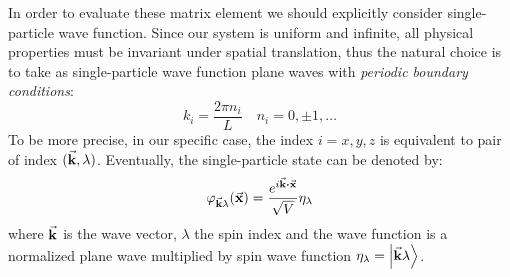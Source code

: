 \documentclass[../main/main.tex]{subfiles}
\begin{document}
In order to evaluate these matrix element we should explicitly consider single-particle wave function.
Since our system is uniform and infinite, all physical properties must be invariant under spatial translation, thus the natural choice is to take as single-particle wave function plane waves with \emph{periodic boundary conditions}:
\begin{equation*}
  k_i = \frac{2 \pi n_i}{L} \quad n_i=0,\pm1,\dots
\end{equation*}
To be more precise, in our specific case, the index \( i=x,y,z \) is equivalent  to pair of index \( (\va{k},\lambda ) \).
Eventually, the single-particle state can be denoted by:
\begin{equation*}
  \varphi_{\va{k} \lambda } (\va{x}) = \frac{e^{i \va{k}\vdot \va{x}} }{\sqrt{V} } \eta _ \lambda
\end{equation*}
 where \( \va{k} \) is the wave vector, \( \lambda  \) the spin index and the wave function is a normalized plane wave multiplied by spin wave function \( \eta _ \lambda = \ket{\va{k} \lambda }  \).
\end{document}
